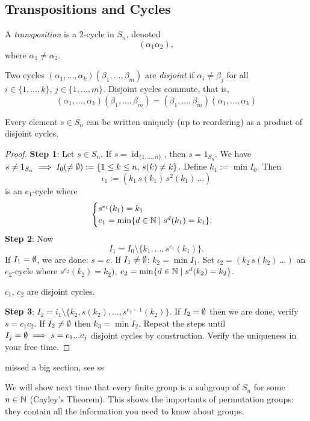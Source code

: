 \subsection{Transpositions and Cycles}
\begin{definition}[Transpositions]
   A \emph{transposition} is a $2$-cycle in $S_n$, denoted  \[
       (\alpha_1 \alpha_2),
   \]
   where $\alpha_1 \neq \alpha_2$.
\end{definition}

\begin{definition}
    Two cycles $(\alpha_1,...,\alpha_k)(\beta_1,...,\beta_m)$ are \emph{disjoint} if $\alpha_i \neq \beta_j$ for all $i \in \{1,...,k\}, \, j \in \{1,...,m\}$. 
    Disjoint cycles commute, that is, \[
        (\alpha_1,...,\alpha_k)(\beta_1,...,\beta_m)=(\beta_1,...,\beta_m)(\alpha_1,...,\alpha_k)
    \]
\end{definition}
\begin{lemma}
    Every element $s\in S_n$ can be written uniquely (up to reordering) as a product of disjoint cycles.
\end{lemma}
\begin{proof}
    \textbf{Step 1}: Let $s\in S_n$. If $s=\operatorname{id}_{\{1,...,n\} }$, then $s=1_{S_n}$. We have $s \neq 1_{S_n} \implies I_0 (\neq \emptyset) := \{1 \leq k \leq n, \, s(k) \neq k\} $. Define $k_1 := \operatorname{min}I_0.$ Then \[
        \iota_1 := ( k_1 \,s(k_1) \, s^2(k_1)\, ... ) 
    \]
   is an $e_1$-cycle where \[
   \begin{cases}
       s^{e_1}(k_1) =k_1 \\
       e_1=\operatorname{min} \{d \in \mathbb{N}  \mid s^{d}(k_1)=k_1\}.
   \end{cases}
   \]
   \textbf{Step 2}: Now \[
       I_1=I_0\setminus \{k_1,...,s^{e_1}(k_1)\}.
   \]
   If $I_1=\emptyset$, we are done: $s = c.$ If $I_1\neq\emptyset$: $k_2=\operatorname{min}I_1$. Set $\iota_2=(k_2\,s(k_2)\,...)$ an $e_2$-cycle where $s^{e_2}(k_2)=k_2)$, $e_2=\operatorname{min}\{d\in \mathbb{N} \mid s^{d}(k_2)=k_2\} $. 
   \begin{note}
       $c_1, \, c_2$ are disjoint cycles.
   \end{note}
   \textbf{Step 3}: $I_2=i_1\setminus \{k_2,s(k_2),...,s^{e_2-1}(k_2)\} $. If $I_2=\emptyset$ then we are done, verify $s=c_1c_2$. If $I_2\neq\emptyset$ then $k_3=\operatorname{min}I_2$. Repeat the steps until $I_j = \emptyset \implies s=c_1 ... c_j$ disjoint cycles by construction. Verify the uniqueness in your free time.
\end{proof}
missed a big section, see ss
\begin{note}
    We will show next time that every finite group is a subgroup of $S_n$ for some $n\in \mathbb{N}$ (Cayley's Theorem). This shows the importants of permutation groups: they contain all the information you need to know about groups.
\end{note}




